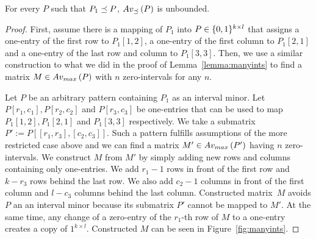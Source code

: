 \begin{thm}
For every $P$ such that $P_1\preceq P$, $Av_{\preceq}\left(P\right)$ is unbounded.
\end{thm}
\begin{proof}
First, assume there is a mapping of $P_1$ into $P\in\{0,1\}^{k\times l}$ that assigns a one-entry of the first row to $P_1[1,2]$, a one-entry of the first column to $P_1[2,1]$ and a one-entry of the last row and column to $P_1[3,3]$. Then, we use a similar construction to what we did in the proof of Lemma~\ref{lemma:manyints} to find a matrix $M\in Av_{max}\left(P\right)$ with $n$ zero-intervals for any $n$.

Let $P$ be an arbitrary pattern containing $P_1$ as an interval minor. Let $P[r_1,c_1],P[r_2,c_2]$ and $P[r_3,c_3]$ be one-entries that can be used to map $P_1[1,2],P_1[2,1]$ and $P_1[3,3]$ respectively. We take a submatrix~$P':=P[[r_1,r_3],[c_2,c_3]]$. Such a pattern fulfills assumptions of the more restricted case above and we can find a matrix $M'\in Av_{max}\left(P'\right)$ having $n$ zero-intervals. We construct $M$ from $M'$ by simply adding new rows and columns containing only one-entries. We add $r_1-1$ rows in front of the first row and $k-r_3$ rows behind the last row. We also add $c_2-1$ columns in front of the first column and $l-c_3$ columns behind the last column. Constructed matrix~$M$ avoids $P$ an an interval minor because its submatrix $P'$ cannot be mapped to $M'$. At the same time, any change of a zero-entry of the $r_1$-th row of $M$ to a one-entry creates a copy of ${1}^{k\times l}$. Constructed $M$ can be seen in Figure~\ref{fig:manyints}.


\end{proof}
